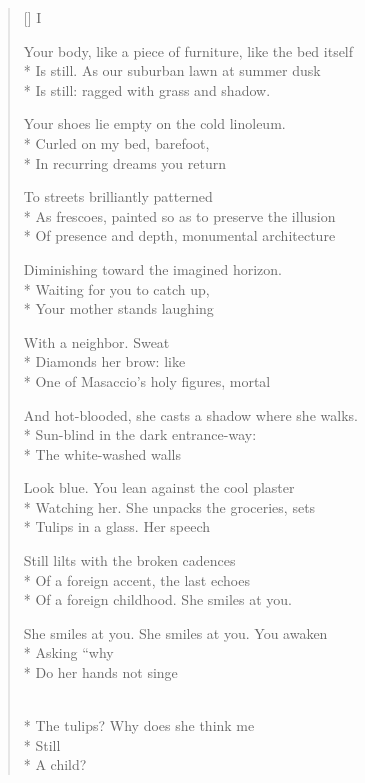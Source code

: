 \label{ch:a_shadowed_poem}
\settowidth{\versewidth}{Your body, like a piece of furniture, like the bed itself}
\begin{verse}[\versewidth]
 \qquad  \qquad  \qquad I

Your body, like a piece of furniture, like the bed itself\\*
Is still. As our suburban lawn at summer dusk\\*
Is still: ragged with grass and shadow.

Your shoes lie empty on the cold linoleum.\\*
Curled on my bed, barefoot,\\*
In recurring dreams you return

To streets brilliantly patterned\\*
As frescoes, painted so as to preserve the illusion\\*
Of presence and depth, monumental architecture

Diminishing toward the imagined horizon.\\*
Waiting for you to catch up,\\*
Your mother stands laughing

With a neighbor.  Sweat\\*
Diamonds her brow: like\\*
One of Masaccio's holy figures, mortal

And hot-blooded, she casts a shadow where she walks.\\*
Sun-blind in the dark entrance-way:\\*
The white-washed walls

Look blue.  You lean against the cool plaster\\*
Watching her.  She unpacks the groceries, sets\\*
Tulips in a glass.  Her speech

Still lilts with the broken cadences\\*
Of a foreign accent, the last echoes\\*
Of a foreign childhood.  She smiles at you.

She smiles at you. She smiles at you. You awaken\\*
Asking ``why\\*
Do her hands not singe

\\*
The tulips? Why does she think me\\*
Still\\*
A child?


\end{verse}
